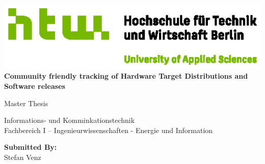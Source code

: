 
\begin{titlepage}
  \begin{center}
	  


	\centering
	\includegraphics[width=15cm]{figures/Q03_HTW_Berlin_Logo_quer_pos_FARBIG_RGB.eps}\\
	\vspace{0.8em}
	\LARGE 
    \sffamily \LARGE \Huge{\textbf{Community friendly tracking of Hardware Target Distributions and Software releases}}

	\vspace{1cm}
	
	\large Master Thesis

    \vspace{1cm}

    \normalsize Informations- und Komminkationstechnik\\
    \normalsize Fachbereich I -- Ingenieurwissenschaften - Energie und Information\\
    
    \vspace{1cm}
    
    \large \textbf{Submitted By:}\\
    
    
    \Large Stefan Venz







\end{center}
\end{titlepage}
